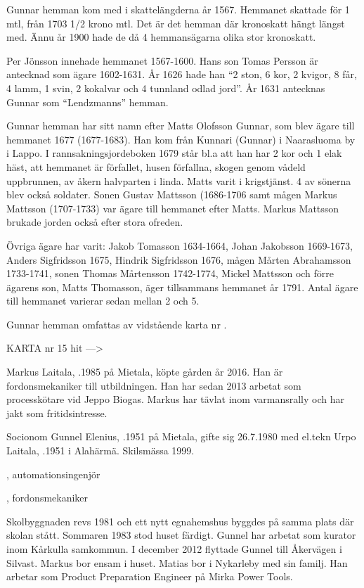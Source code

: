 
Gunnar hemman kom med i skattelängderna år 1567. Hemmanet skattade för 1 mtl, från 1703  1/2 krono mtl. Det är det hemman där kronoskatt hängt längst med. Ännu år 1900 hade de då 4 hemmansägarna olika stor kronoskatt.

Per Jönsson innehade hemmanet 1567-1600. Hans son Tomas Persson är antecknad som ägare 1602-1631. År 1626 hade han ``2 ston, 6 kor, 2 kvigor, 8 får, 4 lamm, 1 svin, 2 kokalvar och 4 tunnland odlad jord''. År 1631 antecknas Gunnar som ``Lendzmanns'' hemman.

Gunnar hemman har sitt namn efter Matts Olofsson Gunnar, som blev ägare till hemmanet 1677 (1677-1683). Han kom från Kunnari (Gunnar) i Naarasluoma by i Lappo. I rannsakningsjordeboken 1679 står bl.a att han har 2 kor och 1 elak häst, att hemmanet är förfallet, husen förfallna, skogen genom vådeld uppbrunnen, av åkern halvparten i linda. Matts varit i krigstjänst. 4 av sönerna blev också soldater. Sonen Gustav Mattsson (1686-1706 samt mågen Markus Mattsson (1707-1733) var ägare till hemmanet efter Matts. Markus Mattsson brukade jorden också efter stora ofreden.

Övriga ägare har varit: Jakob Tomasson 1634-1664, Johan Jakobsson 1669-1673, Anders Sigfridsson 1675,  Hindrik Sigfridsson 1676,  mågen Mårten Abrahamsson 1733-1741, sonen Thomas Mårtensson 1742-1774, Mickel Mattsson och förre ägarens son, Matts Thomasson, äger tillsammans hemmanet år 1791. Antal ägare till hemmanet varierar sedan mellan 2 och 5.


Gunnar hemman omfattas av vidstående karta nr .


KARTA nr 15 hit --->





Markus Laitala, .1985 på Mietala, köpte gården år 2016. Han är fordonsmekaniker till utbildningen. Han har sedan 2013 arbetat som processkötare vid Jeppo Biogas. Markus har tävlat inom varmansrally och har jakt som fritidsintresse.


Socionom Gunnel Elenius, .1951 på Mietala, gifte sig 26.7.1980 med el.tekn Urpo Laitala, .1951 i Alahärmä. Skilsmässa 1999.
\begin{jhchildren}
  \item {}, automationsingenjör
  \item {}, fordonsmekaniker
\end{jhchildren}
Skolbyggnaden revs 1981 och ett nytt egnahemshus byggdes på samma plats där skolan stått. Sommaren 1983 stod huset färdigt. Gunnel har arbetat som kurator inom Kårkulla samkommun.	I december 2012 flyttade Gunnel till Åkervägen i Silvast. Markus bor ensam i huset. Matias bor i Nykarleby med sin familj. Han arbetar som Product Preparation Engineer på Mirka Power Tools.

